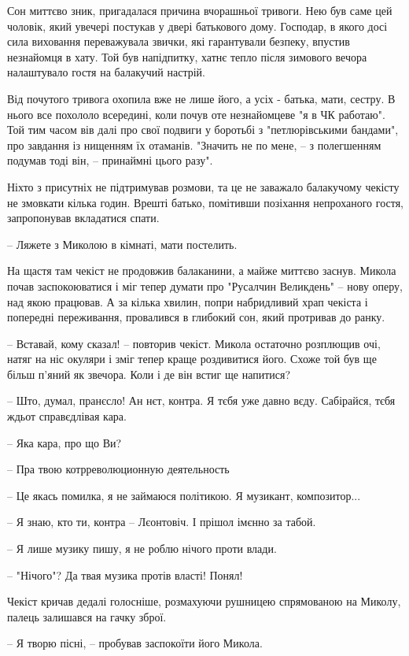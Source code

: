 Сон миттєво зник, пригадалася причина вчорашньої тривоги. Нею був саме цей
чоловік, який увечері постукав у двері батькового дому. Господар, в якого досі
сила виховання переважувала звички, які гарантували безпеку, впустив незнайомця
в хату. Той був напідпитку, хатнє тепло після зимового вечора налаштувало гостя
на балакучий настрій.

Від почутого тривога охопила вже не лише його, а усіх - батька, мати, сестру. В
нього все похололо всередині, коли почув оте незнайомцеве "я в ЧК работаю". Той
тим часом вів далі про свої подвиги у боротьбі з "петлюрівськими бандами", про
завдання із нищенням їх отаманів. "Значить не по мене, – з полегшенням подумав
тоді він, – принаймні цього разу".

Ніхто з присутніх не підтримував розмови, та це не заважало балакучому чекісту
не змовкати кілька годин. Врешті батько, помітивши позіхання непроханого гостя,
запропонував вкладатися спати.

– Ляжете з Миколою в кімнаті, мати постелить.

На щастя там чекіст не продовжив балаканини, а майже миттєво заснув. Микола
почав заспокоюватися і міг тепер думати про "Русалчин Великдень" – нову оперу,
над якою працював. А за кілька хвилин, попри набридливий храп чекіста і
попередні переживання, провалився в глибокий сон, який протривав до ранку.

– Вставай, кому сказал! – повторив чекіст. Микола остаточно розплющив очі,
натяг на ніс окуляри і зміг тепер краще роздивитися його. Схоже той був ще
більш п'яний як звечора. Коли і де він встиг ще напитися?

– Што, думал, пранєсло! Ан нєт, контра. Я тєбя уже давно вєду. Сабірайся, тєбя ждьот справєдлівая кара.

– Яка кара, про що Ви?

– Пра твою котрреволюционную деятельность

– Це якась помилка, я не займаюся політикою. Я музикант, композитор...

– Я знаю, кто ти, контра – Лєонтовіч. І прішол імєнно за табой. 

 – Я лише музику пишу, я не роблю нічого проти влади.

– "Нічого"? Да твая музика протів власті! Понял!

Чекіст кричав дедалі голосніше, розмахуючи рушницею спрямованою на Миколу, палець залишався на гачку зброї.

– Я творю пісні, – пробував заспокоїти його Микола.

